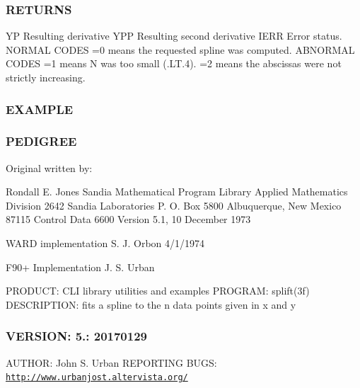 \subsubsection*{R\+E\+T\+U\+R\+NS}

\begin{DoxyVerb}   YP     Resulting derivative
   YPP    Resulting second derivative
   IERR   Error status.
          NORMAL CODES
            =0  means the requested spline was computed.
          ABNORMAL CODES
            =1  means N was too small (.LT.4).
            =2  means the abscissas were not strictly increasing.
\end{DoxyVerb}


\subsubsection*{E\+X\+A\+M\+P\+LE}

\subsubsection*{P\+E\+D\+I\+G\+R\+EE}

\begin{DoxyVerb}Original written by:

  Rondall E. Jones
  Sandia Mathematical Program Library
  Applied Mathematics Division 2642
  Sandia Laboratories
  P. O. Box 5800
  Albuquerque, New Mexico  87115
  Control Data 6600 Version 5.1, 10 December 1973


  WARD implementation   S. J. Orbon        4/1/1974

  F90+ Implementation   J. S. Urban \end{DoxyVerb}


P\+R\+O\+D\+U\+CT\+: C\+LI library utilities and examples P\+R\+O\+G\+R\+AM\+: splift(3f) D\+E\+S\+C\+R\+I\+P\+T\+I\+ON\+: fits a spline to the n data points given in x and y \subsubsection*{V\+E\+R\+S\+I\+ON\+: 5.\+: 20170129}

A\+U\+T\+H\+OR\+: John S. Urban R\+E\+P\+O\+R\+T\+I\+NG B\+U\+GS\+: \href{http://www.urbanjost.altervista.org/}{\tt http\+://www.\+urbanjost.\+altervista.\+org/} \mbox{\label{namespacem__math_afb412a273368e2814058a8fc4197ba1a}} 
